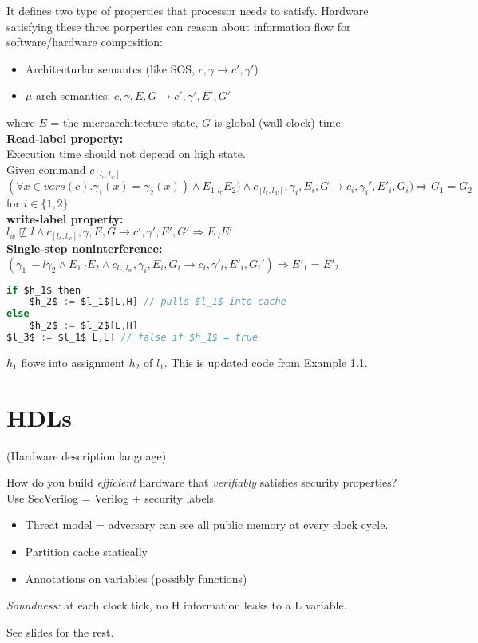 \documentclass{article}
\begin{document}
It defines two type of properties that processor needs to satisfy. Hardware satisfying these three porperties can reason about information flow for software/hardware composition: \\
\begin{itemize}
	\item{Architecturlar semantcs (like SOS, $c,\gamma \longrightarrow c',\gamma'$)}
	\item{$\mu$-arch semantics: $c,\gamma,E,G \longrightarrow c',\gamma',E',G'$}
\end{itemize}

where $E$ =  the microarchitecture state, $G$ is global (wall-clock) time. \\
 
\textbf{Read-label property:} \\
Execution time should not depend on high state. \\
Given command $c_[l_r,l_w]$ \\
$(\forall x \in vars(c) . \gamma_1(x) = \gamma_2(x)) \land E_1 ~_{l_r} E_2) \land c_[l_r,l_w],\gamma_i,E_i,G \longrightarrow c_i,\gamma_i',E'_i,G_i)  \Rightarrow G_1 = G_2$ for $i \in 
\{1,2\}$ \\

\textbf{write-label property:}\\
$l_w \not\sqsubseteq l \land c_{[l_r,l_w]}, \gamma,E,G \longrightarrow c', \gamma',E',G' \Rightarrow E ~_l E' $ \\

\textbf{Single-step noninterference:} \\
$(\gamma_1 ~-l \gamma_2 \land E_1 ~_l E_2 \land c_{l_r,l_w},\gamma_i,E_i,G_i \longrightarrow c_i,\gamma'_i,E'_i,G_i') \Rightarrow E'_1 = E'_2$

\begin{lstlisting}[mathescape,frame=single,basicstyle=\ttfamily,language=java]
if $h_1$ then
    $h_2$ := $l_1$[L,H] // pulls $l_1$ into cache
else 
    $h_2$ := $l_2$[L,H]
$l_3$ := $l_1$[L,L] // false if $h_1$ = true
\end{lstlisting}
$h_1$ flows into assignment $h_2$ of $l_1$. This is updated code from Example 1.1.

\section{HDLs}
(Hardware description language)

How do you build \emph{efficient} hardware that \emph{verifiably} satisfies security properties?
Use SecVerilog = Verilog + security labels

\begin{itemize}
\item Threat model = adversary can see all public memory at every clock cycle.

\item Partition cache statically

\item Annotations on variables (possibly functions)
  
\end{itemize}

\emph{Soundness:} at each clock tick, no H information leaks to a L variable.
  
See slides for the rest.
\end{document}

